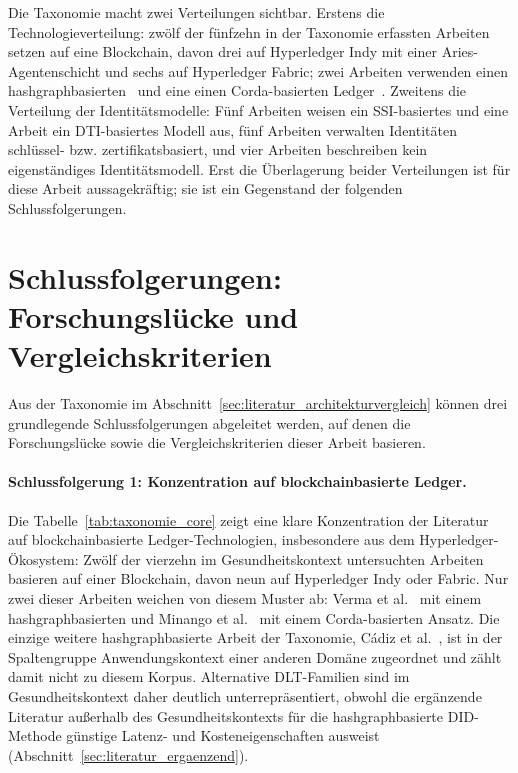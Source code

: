 Die Taxonomie macht zwei Verteilungen sichtbar. Erstens die Technologieverteilung: zwölf der fünfzehn in der Taxonomie erfassten Arbeiten setzen auf eine Blockchain, davon drei auf Hyperledger Indy mit einer Aries-Agentenschicht und sechs auf Hyperledger Fabric; zwei Arbeiten verwenden einen hashgraphbasierten~\cite{verma2024, cadiz2025} und eine einen Corda-basierten Ledger~\cite{minango2025}. Zweitens die Verteilung der Identitätsmodelle: Fünf Arbeiten weisen ein SSI-basiertes und eine Arbeit ein DTI-basiertes Modell aus, fünf Arbeiten verwalten Identitäten schlüssel- bzw. zertifikatsbasiert, und vier Arbeiten beschreiben kein eigenständiges Identitätsmodell. Erst die Überlagerung beider Verteilungen ist für diese Arbeit aussagekräftig; sie ist ein Gegenstand der folgenden Schlussfolgerungen.

\section{Schlussfolgerungen: Forschungslücke und Vergleichskriterien}
\label{sec:literatur_schlussfolgerungen}

Aus der Taxonomie im Abschnitt~\ref{sec:literatur_architekturvergleich} können drei grundlegende Schlussfolgerungen abgeleitet werden, auf denen die Forschungslücke sowie die Vergleichskriterien dieser Arbeit basieren.

\paragraph{Schlussfolgerung 1: Konzentration auf blockchainbasierte Ledger.}
Die Tabelle~\ref{tab:taxonomie_core} zeigt eine klare Konzentration der Literatur auf blockchainbasierte Ledger-Technologien, insbesondere aus dem Hyperledger-Ökosystem: Zwölf der vierzehn im Gesundheitskontext untersuchten Arbeiten basieren auf einer Blockchain, davon neun auf Hyperledger Indy oder Fabric. Nur zwei dieser Arbeiten weichen von diesem Muster ab: Verma et al.~\cite{verma2024} mit einem hashgraphbasierten und Minango et al.~\cite{minango2025} mit einem Corda-basierten Ansatz. Die einzige weitere hashgraphbasierte Arbeit der Taxonomie, Cádiz et al.~\cite{cadiz2025}, ist in der Spaltengruppe Anwendungskontext einer anderen Domäne zugeordnet und zählt damit nicht zu diesem Korpus. Alternative DLT-Familien sind im Gesundheitskontext daher deutlich unterrepräsentiert, obwohl die ergänzende Literatur außerhalb des Gesundheitskontexts für die hashgraphbasierte DID-Methode günstige Latenz- und Kosteneigenschaften ausweist (Abschnitt~\ref{sec:literatur_ergaenzend}).


